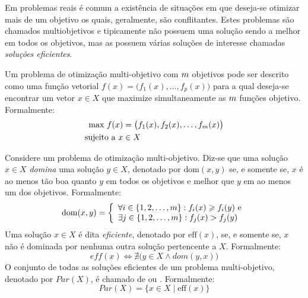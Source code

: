 


Em problemas reais é comum a existência de situações em que deseja-se otimizar
mais de um objetivo os quais, geralmente, são conflitantes.
Estes problemas são chamados multiobjetivos e tipicamente não possuem
uma solução sendo a melhor em todos os objetivos, mas as possuem várias
soluções de interesse chamadas \emph{soluções eficientes}.

Um problema de otimização multi-objetivo com $m$ objetivos pode ser descrito como uma
função vetorial $f(x) = \big(f_1(x), \ldots, f_p(x)\big)$
para a qual deseja-se encontrar um vetor $x \in X$
que maximize simultaneamente as $m$ funções objetivo.
Formalmente:
\begin{align*}
  \text{max} ~ f(x) &=
    \big(f_1(x)
    ,f_2(x)
    ,\ldots
    ,f_{m}(x)\big) \\
  \text{sujeito a} ~ x & \in X
\end{align*}

\begin{mydef}
Considere um problema de otimização multi-objetivo.
Diz-se que uma solução $x \in X$
\emph{domina} uma solução $y \in X$, denotado por $\text{dom}(x, y)$
se, e somente se, $x$ é ao menos tão boa quanto
$y$ em todos os objetivos e melhor que $y$ em ao menos um dos objetivos.
Formalmente:
\begin{equation}
    \text{dom}(x, y) = \left\{
      \begin{array}{l}
          \forall i \in \{1, 2, \ldots, m\}: f_i(x) \geqslant f_i(y) ~\text{e}\\
          \exists j \in \{1, 2, \ldots, m\}: f_j(x) > f_j(y)
  \end{array} \right.
  \label{eq:dom}
\end{equation}
Uma solução $x \in X$ é dita \emph{eficiente}, denotado por $\text{eff}(x)$,
se, e somente se, $x$ não é dominada por nenhuma outra solução pertencente a $X$.
Formalmente:
\begin{displaymath}
  eff(x) \iff \nexists \big(y \in X \wedge dom(y, x) \big)
\end{displaymath}
O conjunto de todas as soluções eficientes de um problema multi-objetivo,
denotado por $Par(X)$, é chamado de \emph{\paretoset{}} ou \emph{\paretosetII{}}.
Formalmente:
\begin{displaymath}
  Par(X) = \{ x \in X \;|\; \text{eff}(x)\}
\end{displaymath}
\end{mydef}

